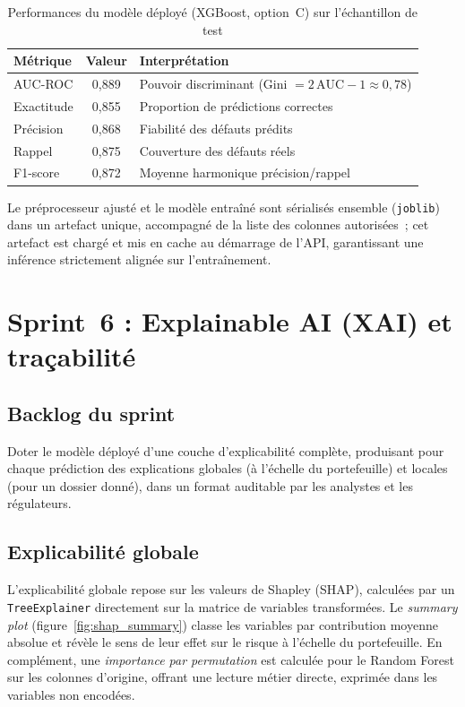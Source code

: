 \documentclass[a4paper,12pt,oneside]{report}
\begin{document}
\begin{table}[H]
\centering
\caption{Performances du modèle déployé (XGBoost, option~C) sur l'échantillon de test}
\label{tab:metrics_deploy}
\renewcommand{\arraystretch}{1.3}
\begin{tabularx}{\textwidth}{@{}l c Y@{}}
\toprule
\textbf{Métrique} & \textbf{Valeur} & \textbf{Interprétation} \\
\midrule
AUC-ROC   & 0{,}889 & Pouvoir discriminant (Gini $= 2\,\text{AUC}-1 \approx 0{,}78$) \\
Exactitude& 0{,}855 & Proportion de prédictions correctes \\
Précision & 0{,}868 & Fiabilité des défauts prédits \\
Rappel    & 0{,}875 & Couverture des défauts réels \\
F1-score  & 0{,}872 & Moyenne harmonique précision/rappel \\
\bottomrule
\end{tabularx}
\end{table}

\noindent
Le préprocesseur ajusté et le modèle entraîné sont sérialisés ensemble (\texttt{joblib}) dans
un artefact unique, accompagné de la liste des colonnes autorisées~; cet artefact est chargé
et mis en cache au démarrage de l'API, garantissant une inférence strictement alignée sur
l'entraînement.

\section{Sprint~6 : Explainable AI (XAI) et traçabilité}

\subsection{Backlog du sprint}

Doter le modèle déployé d'une couche d'explicabilité complète, produisant pour chaque
prédiction des explications globales (à l'échelle du portefeuille) et locales (pour un
dossier donné), dans un format auditable par les analystes et les régulateurs.

\subsection{Explicabilité globale}

L'explicabilité globale repose sur les valeurs de Shapley (SHAP), calculées par un
\texttt{TreeExplainer} directement sur la matrice de variables transformées. Le
\textit{summary plot} (figure~\ref{fig:shap_summary}) classe les variables par contribution
moyenne absolue et révèle le sens de leur effet sur le risque à l'échelle du portefeuille. En
complément, une \textit{importance par permutation} est calculée pour le Random Forest sur les
colonnes d'origine, offrant une lecture métier directe, exprimée dans les variables non
encodées.
\end{document}
